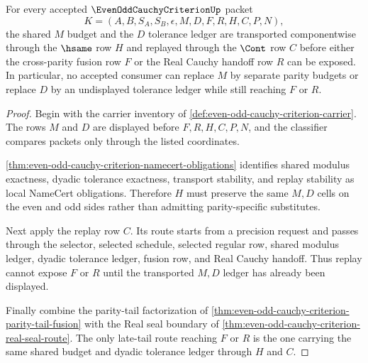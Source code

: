 \begin{theorem}
\label{thm:even-odd-cauchy-criterion-shared-modulus-transport}
For every accepted $\EvenOddCauchyCriterionUp$ packet
$$
K=(A,B,S_A,S_B,\epsilon,M,D,F,R,H,C,P,N),
$$
the shared $M$ budget and the $D$ tolerance ledger are transported componentwise through the $\hsame$ row $H$ and replayed through the $\Cont$ row $C$ before either the cross-parity fusion row $F$ or the Real Cauchy handoff row $R$ can be exposed. In particular, no accepted consumer can replace $M$ by separate parity budgets or replace $D$ by an undisplayed tolerance ledger while still reaching $F$ or $R$.
\end{theorem}
\begin{proof}
Begin with the carrier inventory of \autoref{def:even-odd-cauchy-criterion-carrier}. The rows $M$ and $D$ are displayed before $F,R,H,C,P,N$, and the classifier compares packets only through the listed coordinates.

\autoref{thm:even-odd-cauchy-criterion-namecert-obligations} identifies shared modulus exactness, dyadic tolerance exactness, transport stability, and replay stability as local NameCert obligations. Therefore $H$ must preserve the same $M,D$ cells on the even and odd sides rather than admitting parity-specific substitutes.

Next apply the replay row $C$. Its route starts from a precision request and passes through the selector, selected schedule, selected regular row, shared modulus ledger, dyadic tolerance ledger, fusion row, and Real Cauchy handoff. Thus replay cannot expose $F$ or $R$ until the transported $M,D$ ledger has already been displayed.

Finally combine the parity-tail factorization of \autoref{thm:even-odd-cauchy-criterion-parity-tail-fusion} with the Real seal boundary of \autoref{thm:even-odd-cauchy-criterion-real-seal-route}. The only late-tail route reaching $F$ or $R$ is the one carrying the same shared budget and dyadic tolerance ledger through $H$ and $C$.
\end{proof}

